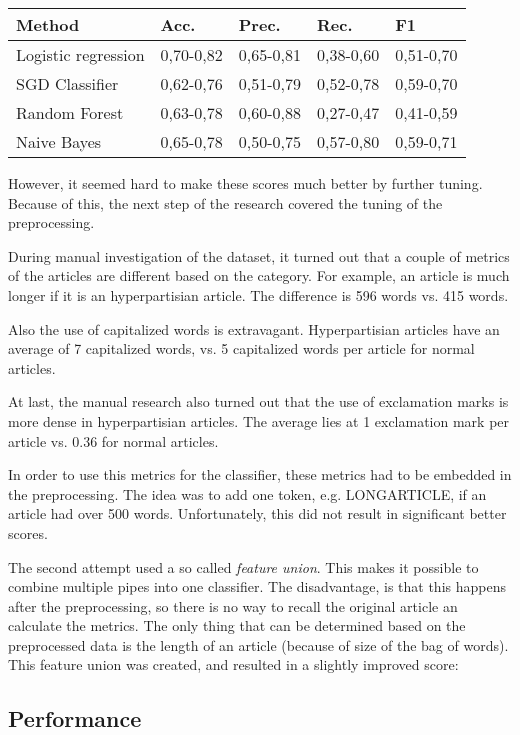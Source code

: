 \begin{tabular}{ l | l l l l }
	Method & Acc. & Prec. & Rec. & F1 \\
	\hline
	Logistic regression & 0,70-0,82 & 0,65-0,81 & 0,38-0,60 & 0,51-0,70 \\
	SGD Classifier & 0,62-0,76 & 0,51-0,79 & 0,52-0,78 & 0,59-0,70 \\
	Random Forest & 0,63-0,78 & 0,60-0,88 & 0,27-0,47 & 0,41-0,59 \\
	Naive Bayes & 0,65-0,78 & 0,50-0,75 & 0,57-0,80 & 0,59-0,71 \\
\end{tabular}

\noindent However, it seemed hard to make these scores much better by further tuning. Because of this, the next step of the research covered the tuning of the preprocessing. 

During manual investigation of the dataset, it turned out that a couple of metrics of the articles are different based on the category. For example, an article is much longer if it is an hyperpartisian article. The difference is 596 words vs. 415 words. 

Also the use of capitalized words is extravagant. Hyperpartisian articles have an average of 7 capitalized words, vs. 5 capitalized words per article for normal articles. 

At last, the manual research also turned out that the use of exclamation marks is more dense in hyperpartisian articles. The average lies at 1 exclamation mark per article vs. 0.36 for normal articles.

In order to use this metrics for the classifier, these metrics had to be embedded in the preprocessing. The idea was to add one token, e.g. LONGARTICLE, if an article had over 500 words. Unfortunately, this did not result in significant better scores.

The second attempt used a so called \textit{feature union}. This makes it possible to combine multiple pipes into one classifier. The disadvantage, is that this happens after the preprocessing, so there is no way to recall the original article an calculate the metrics. The only thing that can be determined based on the preprocessed data is the length of an article (because of size of the bag of words). This feature union was created, and resulted in a slightly improved score:

\subsection{Performance}
 

